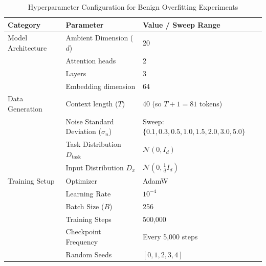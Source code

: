 \documentclass[11pt,a4paper]{article}
\begin{document}
\begin{table}[h]
\centering
\caption{Hyperparameter Configuration for Benign Overfitting Experiments}
\label{tab:hyperparameters}
\begin{tabular}{lll}
\toprule
\textbf{Category} & \textbf{Parameter} & \textbf{Value / Sweep Range} \\
\midrule
Model Architecture & Ambient Dimension ($d$) & 20 \\
& Attention heads & 2 \\
& Layers & 3 \\
& Embedding dimension & 64 \\
\midrule
Data Generation & Context length ($T$) & 40 (so $T+1 = 81$ tokens) \\
& Noise Standard Deviation ($\sigma_n$) & Sweep: $\{0.1, 0.3, 0.5, 1.0, 1.5, 2.0, 3.0, 5.0\}$ \\
& Task Distribution $D_{\text{task}}$ & $\mathcal{N}(0, I_d)$ \\
& Input Distribution $D_x$ & $\mathcal{N}(0, \frac{1}{d} I_d)$ \\
\midrule
Training Setup & Optimizer & AdamW \\
& Learning Rate & $10^{-4}$ \\
& Batch Size ($B$) & 256 \\
& Training Steps & 500,000 \\
& Checkpoint Frequency & Every 5,000 steps \\
& Random Seeds & $[0, 1, 2, 3, 4]$ \\
\bottomrule
\end{tabular}
\end{table}
\end{document}
